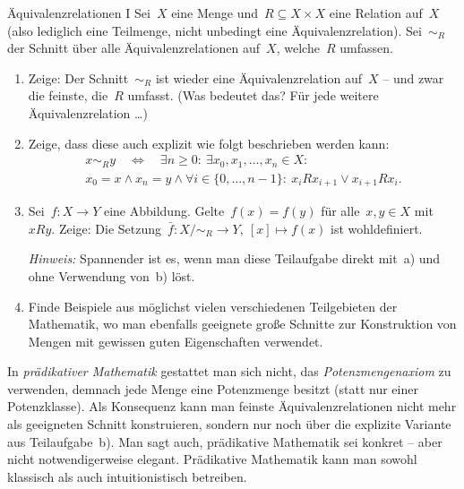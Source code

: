\documentclass{uebblatt}
\begin{document}

\begin{aufgabe}{Äquivalenzrelationen I}
Sei~$X$ eine Menge und~$R \subseteq X \times X$ eine Relation auf~$X$
(also lediglich eine Teilmenge, nicht unbedingt eine Äquivalenzrelation).
Sei~$\sim_R$ der Schnitt über alle Äquivalenzrelationen auf~$X$, welche~$R$
umfassen.
\begin{enumerate}
\item Zeige: Der Schnitt~$\sim_R$ ist wieder eine Äquivalenzrelation auf~$X$
-- und zwar die feinste, die~$R$ umfasst. (Was bedeutet das? Für jede weitere
Äquivalenzrelation \ldots)

\item Zeige, dass diese auch explizit wie folgt beschrieben
werden kann:
\begin{multline*}
  x \sim_R y \quad\Longleftrightarrow\quad
  \exists n \geq 0{:}\
  \exists x_0,x_1,\ldots,x_n \in X{:} \\
  x_0 = x \wedge x_n = y \wedge
  \forall i \in \{ 0 , \ldots, n-1 \}{:}\
  x_i R x_{i+1} \vee x_{i+1} R x_i.
\end{multline*}

\item Sei~$f : X \to Y$ eine Abbildung. Gelte~$f(x) = f(y)$ für alle~$x,y \in
X$ mit~$xRy$. Zeige: Die Setzung~$\bar f : X/{\sim_R} \to Y,\ [x] \mapsto f(x)$
ist wohldefiniert.

{\tiny
\emph{Hinweis:} Spannender ist es, wenn man diese Teilaufgabe direkt mit~a) und
ohne Verwendung von~b) löst.\par}

\item Finde Beispiele aus möglichst vielen verschiedenen Teilgebieten der
Mathematik, wo man ebenfalls geeignete große Schnitte zur Konstruktion von Mengen
mit gewissen guten Eigenschaften verwendet.
\end{enumerate}

{\tiny
In \emph{prädikativer Mathematik} gestattet man sich nicht, das
\emph{Potenzmengenaxiom} zu verwenden, demnach jede Menge eine Potenzmenge
besitzt (statt nur einer Potenzklasse). Als Konsequenz kann man feinste
Äquivalenzrelationen nicht mehr als geeigneten Schnitt konstruieren, sondern
nur noch über die explizite Variante aus Teilaufgabe~b). Man sagt auch,
prädikative Mathematik sei konkret -- aber nicht notwendigerweise elegant.
Prädikative Mathematik kann man sowohl klassisch als auch intuitionistisch
betreiben.\par}
\end{aufgabe}
\end{document}

